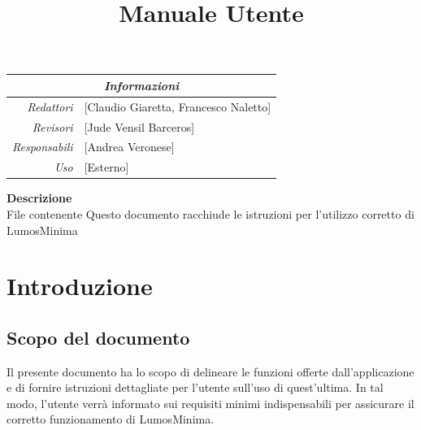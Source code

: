\documentclass[9pt]{article}
\begin{document}
\graphicspath{ {../templates/img/} {./img}}
\setcounter{tocdepth}{4}
\setcounter{secnumdepth}{4}
\title{Manuale Utente}

\firstPage
\maketitle

\begin{center}
	\begin{tabular}{r | l}
		\multicolumn{2}{c}{\textit{Informazioni}}        \\
		\hline

		\textit{Redattori}    &
		[Claudio Giaretta, Francesco Naletto]\makecell{} \\

		\textit{Revisori}     &
		[Jude Vensil Barceros]\makecell{}                \\
		\textit{Responsabili} &
		[Andrea Veronese]\makecell{}                     \\
		\textit{Uso}          &
		[Esterno]\makecell{}                             \\
	\end{tabular}
\end{center}

\begin{center}
	\textbf{Descrizione}\\
	File contenente Questo documento racchiude le istruzioni per l’utilizzo corretto di LumosMinima
\end{center}

\pagebreak

\printindex
\pagebreak

\tableofcontents
\pagebreak


\makeversioni

\section{Introduzione}
\subsection{Scopo del documento}
Il presente documento ha lo scopo di delineare le funzioni offerte dall'applicazione e di fornire istruzioni dettagliate per l'utente sull'uso di quest'ultima.
In tal modo, l'utente verrà informato sui requisiti minimi indispensabili per assicurare il corretto funzionamento di LumosMinima.
\end{document}
